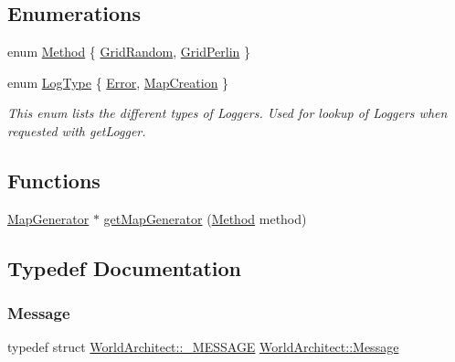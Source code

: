 \subsection*{Enumerations}
\begin{DoxyCompactItemize}
\item 
enum \mbox{\hyperlink{namespace_world_architect_a9bb4333e2d555bf42bf7d14ec2a2ae7b}{Method}} \{ \mbox{\hyperlink{namespace_world_architect_a9bb4333e2d555bf42bf7d14ec2a2ae7ba73e5bbdae306a94e7fa95e797dfeb5dd}{Grid\+Random}}, 
\mbox{\hyperlink{namespace_world_architect_a9bb4333e2d555bf42bf7d14ec2a2ae7ba023523cc51ab3633fe50997121f93a44}{Grid\+Perlin}}
 \}
\item 
enum \mbox{\hyperlink{namespace_world_architect_adf13e54f2c38346ed9d5013cff07fc8e}{Log\+Type}} \{ \mbox{\hyperlink{namespace_world_architect_adf13e54f2c38346ed9d5013cff07fc8ea44dfaf0aee28e2619e6bff75a7d60ba2}{Error}}, 
\mbox{\hyperlink{namespace_world_architect_adf13e54f2c38346ed9d5013cff07fc8ea7af42ff20928d5e5e2650a97d7e277d0}{Map\+Creation}}
 \}
\begin{DoxyCompactList}\small\item\em This enum lists the different types of Loggers. Used for lookup of Loggers when requested with get\+Logger. \end{DoxyCompactList}\end{DoxyCompactItemize}
\subsection*{Functions}
\begin{DoxyCompactItemize}
\item 
\mbox{\hyperlink{class_world_architect_1_1_map_generator}{Map\+Generator}} $\ast$ \mbox{\hyperlink{namespace_world_architect_a984fb538abd7ab5b38bbce0a7bfae707}{get\+Map\+Generator}} (\mbox{\hyperlink{namespace_world_architect_a9bb4333e2d555bf42bf7d14ec2a2ae7b}{Method}} method)
\end{DoxyCompactItemize}


\subsection{Typedef Documentation}
\mbox{\label{namespace_world_architect_a43ffc83197b30a5636e3dc65fba782a1}} 
\subsubsection{\texorpdfstring{Message}{Message}}
{\footnotesize\ttfamily typedef struct \mbox{\hyperlink{struct_world_architect_1_1___m_e_s_s_a_g_e}{World\+Architect\+::\+\_\+\+M\+E\+S\+S\+A\+GE}}  \mbox{\hyperlink{namespace_world_architect_a43ffc83197b30a5636e3dc65fba782a1}{World\+Architect\+::\+Message}}}



